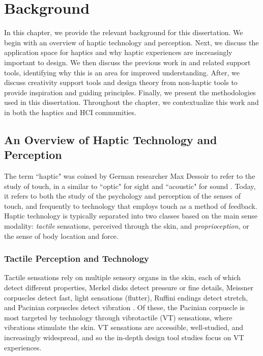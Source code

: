 
\chapter{Background}
\label{ch:rw}

In this chapter, we provide the relevant background for this dissertation.
We begin with an overview of haptic technology and perception.
Next, we discuss the application space for haptics and why haptic experiences are increasingly important to design.
We then discuss the previous work in \haxd and related support tools, identifying why this is an area for improved understanding.
After, we discuss creativity support tools and design theory from non-haptic tools to provide inspiration and guiding principles.
Finally, we present the methodologies used in this dissertation.
Throughout the chapter, we contextualize this work and \haxd in both the haptics and HCI communities.


%
%
\section{An Overview of Haptic Technology and Perception}
The term ``haptic" was coined by German researcher Max Dessoir to refer to the study of touch, in a similar to ``optic" for sight and ``acoustic" for sound \cite{Grunwald2008}.
Today, it refers to both the study of the psychology and perception of the senses of touch, and frequently to technology that employs touch as a method of feedback.
Haptic technology is typically separated into two classes based on the main sense modality: \emph{tactile} sensations, perceived through the skin, and \emph{proprioception}, or the sense of body location and force.

\subsection{Tactile Perception and Technology}
Tactile sensations rely on multiple sensory organs in the skin, each of which detect different properties, \eg Merkel disks detect pressure or fine details, Meissner corpuscles detect fast, light sensations (flutter), Ruffini endings detect stretch, and Pacinian corpuscles detect vibration \cite{ChoiKuchenbecker2013}.
Of these, the Pacinian corpuscle is most targeted by technology through vibrotactile (VT) sensations, where vibrations stimulate the skin.
VT sensations are accessible, well-studied, and increasingly widespread, and so the in-depth design tool studies focus on VT experiences.

